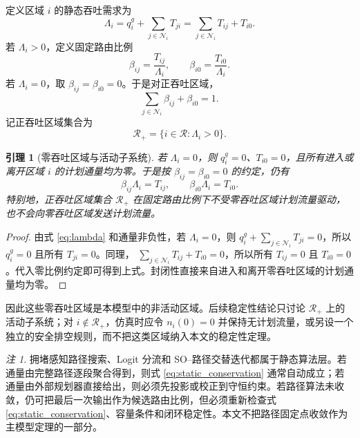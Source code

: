 \documentclass[a4paper,12pt]{article}
\theoremstyle{plain}
\newtheorem{lemma}[theorem]{引理}
\theoremstyle{definition}
\theoremstyle{remark}
\newtheorem{remark}[theorem]{注}
\begin{document}
定义区域 $i$ 的静态吞吐需求为
\begin{equation}\label{eq:lambda}
    \Lambda_i
    =
    q_i^g+\sum_{j\in\mathcal N_i}T_{ji}
    =
    \sum_{j\in\mathcal N_i}T_{ij}+T_{i0}.
\end{equation}
若 $\Lambda_i>0$，定义固定路由比例
\begin{equation}\label{eq:beta}
    \beta_{ij}=\frac{T_{ij}}{\Lambda_i},
    \qquad
    \beta_{i0}=\frac{T_{i0}}{\Lambda_i}.
\end{equation}
若 $\Lambda_i=0$，取 $\beta_{ij}=\beta_{i0}=0$。于是对正吞吐区域，
\begin{equation}\label{eq:beta_sum}
    \sum_{j\in\mathcal N_i}\beta_{ij}+\beta_{i0}=1.
\end{equation}
记正吞吐区域集合为
\begin{equation}\label{eq:positive_regions}
    \mathcal R_+=\{i\in\mathcal R:\Lambda_i>0\}.
\end{equation}

\begin{lemma}[零吞吐区域与活动子系统]\label{lem:zero_region}
若 $\Lambda_i=0$，则 $q_i^g=0$、$T_{i0}=0$，且所有进入或离开区域 $i$ 的计划通量均为零。于是按 $\beta_{ij}=\beta_{i0}=0$ 的约定，仍有
\[
    \beta_{ij}\Lambda_i=T_{ij},\qquad \beta_{i0}\Lambda_i=T_{i0}.
\]
特别地，正吞吐区域集合 $\mathcal R_+$ 在固定路由比例下不受零吞吐区域计划流量驱动，也不会向零吞吐区域发送计划流量。
\end{lemma}

\begin{proof}
由式 \eqref{eq:lambda} 和通量非负性，若 $\Lambda_i=0$，则
$q_i^g+\sum_{j\in\mathcal N_i}T_{ji}=0$，所以 $q_i^g=0$ 且所有 $T_{ji}=0$。同理，
$\sum_{j\in\mathcal N_i}T_{ij}+T_{i0}=0$，所以所有 $T_{ij}=0$ 且 $T_{i0}=0$。代入零比例约定即可得到上式。封闭性直接来自进入和离开零吞吐区域的计划通量均为零。
\end{proof}

因此这些零吞吐区域是本模型中的非活动区域。后续稳定性结论只讨论 $\mathcal R_+$ 上的活动子系统；对 $i\notin\mathcal R_+$，仿真时应令 $n_i(0)=0$ 并保持无计划流量，或另设一个独立的安全排空规则，而不把这类区域纳入本文的稳定性定理。

\begin{remark}
拥堵感知路径搜索、Logit 分流和 SO--路径交替迭代都属于静态算法层。若通量由完整路径逐段聚合得到，则式 \eqref{eq:static_conservation} 通常自动成立；若通量由外部规划器直接给出，则必须先投影或校正到守恒约束。若路径算法未收敛，仍可把最后一次输出作为候选路由比例，但必须重新检查式 \eqref{eq:static_conservation}、容量条件和闭环稳定性。本文不把路径固定点收敛作为主模型定理的一部分。
\end{remark}
\end{document}
